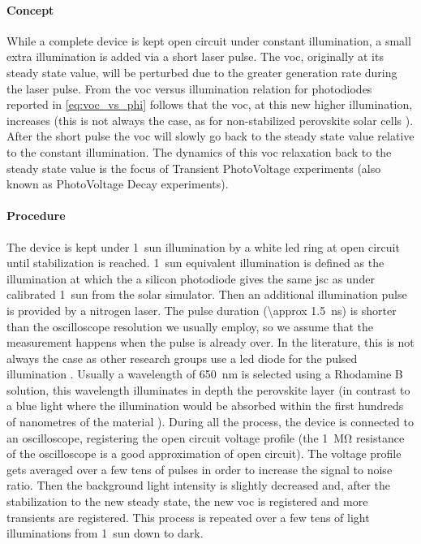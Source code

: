	\paragraph{Concept} While a complete device is kept open circuit under constant illumination, a small extra illumination is added via a short laser pulse.
	The \gls{voc}, originally at its steady state value, will be perturbed due to the greater generation rate during the laser pulse.
	From the \gls{voc} versus illumination relation for photodiodes reported in \cref{eq:voc_vs_phi} follows that the \gls{voc}, at this new higher illumination, increases (this is not always the case, as for non-stabilized perovskite solar cells \cite{Calado2016}).
	After the short pulse the \gls{voc} will slowly go back to the steady state value relative to the constant illumination.
	The dynamics of this \gls{voc} relaxation back to the steady state value is the focus of Transient PhotoVoltage experiments \cite{ORegan2004,ORegan2005,ORegan2006} (also known as PhotoVoltage Decay experiments). 
	
	\paragraph{Procedure} The device is kept under 1~sun illumination by a white \gls{led} ring at open circuit until stabilization is reached.
	1~sun equivalent illumination is defined as the illumination at which the a silicon photodiode gives the same \gls{jsc} as under calibrated 1~sun from the solar simulator.
	Then an additional illumination pulse is provided by a nitrogen laser. The pulse duration (\SI{\approx 1.5}{\ns}) is shorter than the oscilloscope resolution we usually employ, so we assume that the measurement happens when the pulse is already over.
	In the literature, this is not always the case as other research groups use a \gls{led} diode for the pulsed illumination \cite{Calado2016}.
	Usually a wavelength of \SI{650}{\nm} is selected using a Rhodamine B solution\cite{RadiantDyesLaser}, this wavelength illuminates in depth the perovskite layer (in contrast to a blue light where the illumination would be absorbed within the first hundreds of nanometres of the material \cite{Bi2016}).
	During all the process, the device is connected to an oscilloscope, registering the open circuit voltage profile (the \SI{1}{\Mohm} resistance of the oscilloscope is a good approximation of open circuit). %
	The voltage profile gets averaged over a few tens of pulses in order to increase the signal to noise ratio.
	Then the background light intensity is slightly decreased and, after the stabilization to the new steady state, the new  \gls{voc} is registered and more transients are registered. This process is repeated over a few tens of light illuminations from 1~sun down to dark.
	
